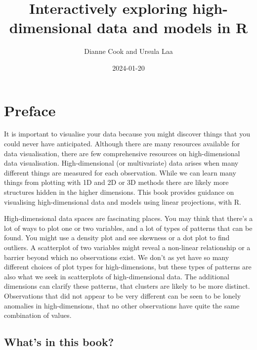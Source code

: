 \documentclass[
  letterpaper,
]{krantz}
\title{Interactively exploring high-dimensional data and models in R}
\author{Dianne Cook and Ursula Laa}
\date{2024-01-20}
\renewcommand*\contentsname{Table of contents}
\newcommand\contentsname{Table of contents}
\begin{document}
\maketitle
\ifdefined\Shaded\renewenvironment{Shaded}{\begin{tcolorbox}[breakable, boxrule=0pt, sharp corners, enhanced, frame hidden, interior hidden, borderline west={3pt}{0pt}{shadecolor}]}{\end{tcolorbox}}\fi

\renewcommand*\contentsname{Table of contents}
{
\hypersetup{linkcolor=}
\setcounter{tocdepth}{2}
\tableofcontents
}

\hypertarget{preface}{%
\chapter*{Preface}\label{preface}}


It is important to visualise your data because you might discover things
that you could never have anticipated. Although there are many resources
available for data visualisation, there are few comprehensive resources
on high-dimensional data visualisation. High-dimensional (or
multivariate) data arises when many different things are measured for
each observation. While we can learn many things from plotting with 1D
and 2D or 3D methods there are likely more structures hidden in the
higher dimensions. This book provides guidance on visualising
high-dimensional data and models using linear projections, with R.

High-dimensional data spaces are fascinating places. You may think that
there's a lot of ways to plot one or two variables, and a lot of types
of patterns that can be found. You might use a density plot and see
skewness or a dot plot to find outliers. A scatterplot of two variables
might reveal a non-linear relationship or a barrier beyond which no
observations exist. We don't as yet have so many different choices of
plot types for high-dimensions, but these types of patterns are also
what we seek in scatterplots of high-dimensional data. The additional
dimensions can clarify these patterns, that clusters are likely to be
more distinct. Observations that did not appear to be very different can
be seen to be lonely anomalies in high-dimensions, that no other
observations have quite the same combination of values.

\hypertarget{whats-in-this-book}{%
\section*{What's in this book?}\label{whats-in-this-book}}
\end{document}
